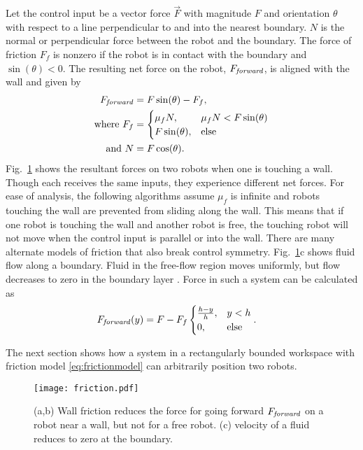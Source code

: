 Let the control input be a vector force $\vec{F}$ with magnitude $F$ and orientation $\theta$ with respect to a line perpendicular to and into the nearest boundary. $N$ is the normal or perpendicular force between the robot and the boundary. The force of friction $F_f$ is nonzero if the robot is in contact with the boundary and  $\sin(\theta) < 0$. The resulting net force on the robot, $F_{\text{\emph{forward}}}$, is aligned with the wall and given by
\begin{align}
F_{\text{\emph{forward}}} &=  F \sin(\theta) - F_f , \nonumber \\
\text{where }  F_f &= \begin{cases}  \mu_f N, &  \mu_f N < F \sin(\theta)  \label{eq:frictionmodel}  \\
F \sin(\theta), & \text{else} \end{cases} \\ %
\text{and } N &= F \cos(\theta) .\nonumber
\end{align}
 Fig.~\ref{fig:friction} shows the resultant forces on two robots when one is touching a wall. 
Though each receives the same inputs,  they experience different net forces.
  For ease of analysis, the following algorithms assume $\mu_f$ is infinite and robots touching the wall are prevented from sliding along the wall.
This means that if one robot is touching the wall and another robot is free, the touching robot will not move when the control input is parallel or into the wall. 
There are many alternate models of friction that also break control symmetry. Fig.~\ref{fig:friction}c shows fluid flow along a boundary.  Fluid in the free-flow region moves uniformly, but flow decreases to zero in the boundary layer \cite{fluidMechanics}.  Force in such a system can be calculated as
\begin{align}
F_{\text{\emph{forward}}}(y) &= F - F_f\begin{cases}  \frac{h-y}{h}   , &  y<h \label{eq:boundarylayerflow} \\
0, & \text{else} \end{cases}.
\end{align}

The next section shows how a system in a rectangularly bounded workspace with friction model \eqref{eq:frictionmodel} can arbitrarily position two robots. 
\begin{figure}[h]
\begin{center}
\texttt{[image: friction.pdf]} 
\vspace{-1em}
\caption{(a,b) Wall friction reduces the force for going forward $F_{\text{\emph{forward}}}$ on a robot near a wall, but not for a free robot. (c) velocity of a fluid reduces to zero at the boundary.
\label{fig:friction}
}\vspace{-1em}
\end{center}
\end{figure} 




